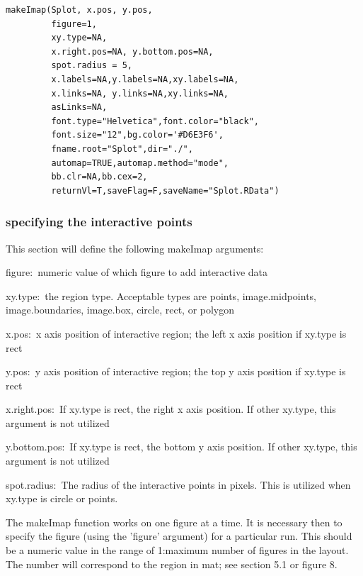 \documentclass[]{article}
\begin{document}
\begin{verbatim}
makeImap(Splot, x.pos, y.pos,
         figure=1,
         xy.type=NA, 
         x.right.pos=NA, y.bottom.pos=NA, 
         spot.radius = 5, 
         x.labels=NA,y.labels=NA,xy.labels=NA,
         x.links=NA, y.links=NA,xy.links=NA,
         asLinks=NA,
         font.type="Helvetica",font.color="black", 
         font.size="12",bg.color='#D6E3F6',  
         fname.root="Splot",dir="./",
         automap=TRUE,automap.method="mode",
         bb.clr=NA,bb.cex=2,               
         returnVl=T,saveFlag=F,saveName="Splot.RData")
\end{verbatim}

\subsubsection{specifying the interactive points}

This section will define the following makeImap arguments:
\begin{description}
   \item{figure:~}{numeric value of which figure to add interactive data}
   \item{xy.type:~}{the region type. Acceptable types are points, image.midpoints, image.boundaries, image.box, circle, rect, or polygon}
   \item{x.pos:~}{x axis position of interactive region; the left x axis position if xy.type is rect}
   \item{y.pos:~}{y axis position of interactive region; the top y axis position if xy.type is rect}
   \item{x.right.pos:~}{If xy.type is rect, the right x axis position. If other xy.type, this argument is not utilized}
   \item{y.bottom.pos:~}{If xy.type is rect, the bottom y axis position. If other xy.type, this argument is not utilized}
   \item{spot.radius:~}{The radius of the interactive points in pixels. This is utilized when xy.type is circle or points.}
\end{description}


\indent The makeImap function works on one figure at a time. It is necessary then to specify the figure (using the 'figure' argument) for a particular run. This should be a numeric value in the range of 1:maximum number of figures in the layout.  The number will correspond to the region in mat; see section 5.1 or figure 8. \newline
\end{document}
